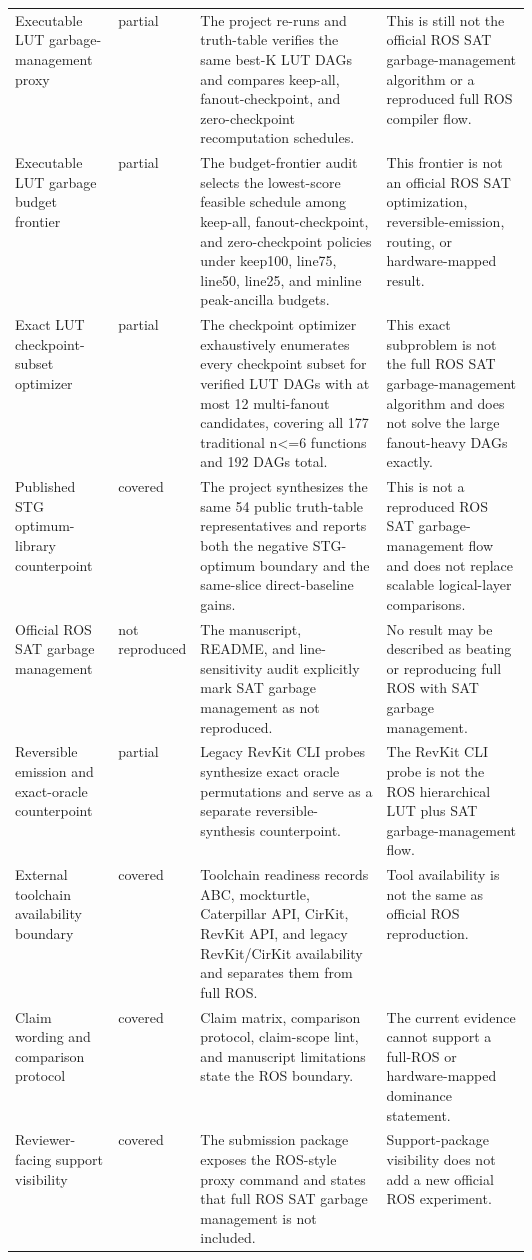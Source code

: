 \begin{tabularx}{\linewidth}{>{\raggedright\arraybackslash}p{0.20\linewidth}>{\raggedright\arraybackslash}p{0.12\linewidth}>{\raggedright\arraybackslash}X>{\raggedright\arraybackslash}p{0.28\linewidth}}
Executable LUT garbage-management proxy & partial & The project re-runs and truth-table verifies the same best-K LUT DAGs and compares keep-all, fanout-checkpoint, and zero-checkpoint recomputation schedules. & This is still not the official ROS SAT garbage-management algorithm or a reproduced full ROS compiler flow. \\
Executable LUT garbage budget frontier & partial & The budget-frontier audit selects the lowest-score feasible schedule among keep-all, fanout-checkpoint, and zero-checkpoint policies under keep100, line75, line50, line25, and minline peak-ancilla budgets. & This frontier is not an official ROS SAT optimization, reversible-emission, routing, or hardware-mapped result. \\
Exact LUT checkpoint-subset optimizer & partial & The checkpoint optimizer exhaustively enumerates every checkpoint subset for verified LUT DAGs with at most 12 multi-fanout candidates, covering all 177 traditional n<=6 functions and 192 DAGs total. & This exact subproblem is not the full ROS SAT garbage-management algorithm and does not solve the large fanout-heavy DAGs exactly. \\
Published STG optimum-library counterpoint & covered & The project synthesizes the same 54 public truth-table representatives and reports both the negative STG-optimum boundary and the same-slice direct-baseline gains. & This is not a reproduced ROS SAT garbage-management flow and does not replace scalable logical-layer comparisons. \\
Official ROS SAT garbage management & not reproduced & The manuscript, README, and line-sensitivity audit explicitly mark SAT garbage management as not reproduced. & No result may be described as beating or reproducing full ROS with SAT garbage management. \\
Reversible emission and exact-oracle counterpoint & partial & Legacy RevKit CLI probes synthesize exact oracle permutations and serve as a separate reversible-synthesis counterpoint. & The RevKit CLI probe is not the ROS hierarchical LUT plus SAT garbage-management flow. \\
External toolchain availability boundary & covered & Toolchain readiness records ABC, mockturtle, Caterpillar API, CirKit, RevKit API, and legacy RevKit/CirKit availability and separates them from full ROS. & Tool availability is not the same as official ROS reproduction. \\
Claim wording and comparison protocol & covered & Claim matrix, comparison protocol, claim-scope lint, and manuscript limitations state the ROS boundary. & The current evidence cannot support a full-ROS or hardware-mapped dominance statement. \\
Reviewer-facing support visibility & covered & The submission package exposes the ROS-style proxy command and states that full ROS SAT garbage management is not included. & Support-package visibility does not add a new official ROS experiment. \\
\bottomrule
\end{tabularx}
